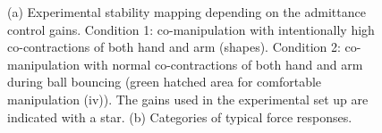 \begin{figure}[!htb]
{
		}
		\shorthandon{;} 
		\caption{(a) Experimental stability mapping depending on the admittance control gains. Condition 1: co-manipulation with intentionally high co-contractions of both hand and arm (shapes). Condition 2: co-manipulation with normal co-contractions of both hand and arm during ball bouncing (green hatched area for comfortable manipulation (iv)). The gains used in the experimental set up are indicated with a star. (b) Categories of typical force responses.} \vspace{-10pt}
		\label{fig_exp_stability_map}
	\end{figure}